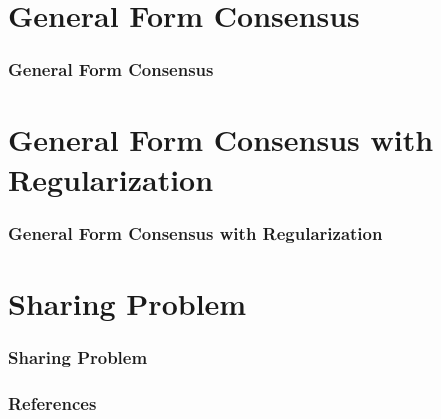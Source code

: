 \section[General Consensus]{General Form Consensus}


\begin{frame}
\frametitle{General Form Consensus}
    
\end{frame}


\section[General Consensus with Regularization]{General Form Consensus with Regularization}


\begin{frame}
\frametitle{General Form Consensus with Regularization}
    
\end{frame}


\section[Sharing Problem]{Sharing Problem}


\begin{frame}
\frametitle{Sharing Problem}

\end{frame}


\begin{frame}[allowframebreaks]
\frametitle{References}

{\footnotesize


}

\end{frame}









